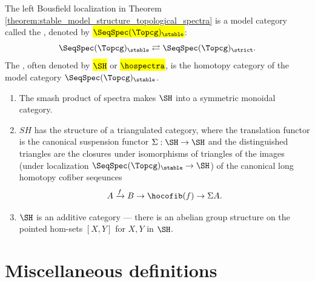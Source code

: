 \begin{definition}
The left Bousfield localization in Theorem \ref{theorem:stable_model_structure_topological_spectra} is a model category called the , denoted by \hl{$\SeqSpec(\Topcg)_\stable$}:
    $$\SeqSpec(\Topcg)_{\stable} \rightleftarrows \SeqSpec(\Topcg)_{\strict}.$$
The , often denoted by \hl{$\SH$} or \hl{$\hospectra$}, is the homotopy category of the model category $\SeqSpec(\Topcg)_\stable$. 
\end{definition}

\begin{claim}
    \begin{enumerate}
        \item The smash product of spectra makes $\SH$ into a symmetric monoidal category.
        \item $SH$ has the structure of a triangulated category, where the translation functor is the canonical suspension functor $\Sigma: \SH \to \SH$ and the distinguished triangles are the closures under isomorphisms of triangles of the images (under localization $\SeqSpec(\Topcg)_\stable \to \SH$) of the canonical long homotopy cofiber seqeunces
        $$A \xrightarrow{f} B \to \hocofib(f) \to \Sigma A.$$
        \item $\SH$ is an additive category --- there is an abelian group structure on the pointed hom-sets $[X,Y]$ for $X,Y$ in $\SH$. 
    \end{enumerate}
\end{claim}

\appendix

\section{Miscellaneous definitions}












